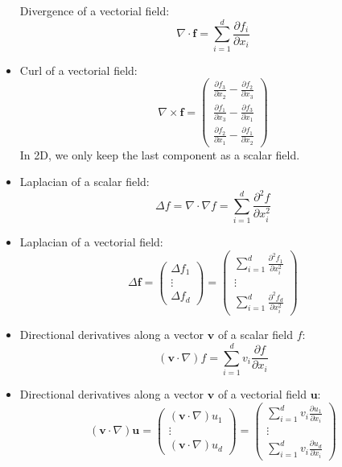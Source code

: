 \begin{itemize}
  Divergence of a vectorial field:
  \begin{equation*}
    \nabla\cdot\mathbf{f} =
    \sum_{i=1}^d \frac{\partial f_i}{\partial x_i}
  \end{equation*}
\item
  Curl of a vectorial field:
  \begin{equation*}
    \nabla\times\mathbf{f} =
    \begin{pmatrix}
      \frac{\partial f_3}{\partial x_2} - \frac{\partial f_2}{\partial x_3} \\
      \frac{\partial f_1}{\partial x_3} - \frac{\partial f_3}{\partial x_1} \\
      \frac{\partial f_2}{\partial x_1} - \frac{\partial f_1}{\partial x_2}
    \end{pmatrix}
  \end{equation*}
  In 2D, we only keep the last component as a scalar field.
\item
  Laplacian of a scalar field:
  \begin{equation*}
    \Delta f = \nabla\cdot\nabla f =
    \sum_{i=1}^d \frac{\partial^2 f}{\partial x_i^2}
  \end{equation*}
\item
  Laplacian of a vectorial field:
  \begin{equation*}
    \Delta \mathbf{f} =
    \begin{pmatrix}
      \Delta f_1 \\ \vdots \\ \Delta f_d
    \end{pmatrix} =
    \begin{pmatrix}
      \sum_{i=1}^d \frac{\partial^2 f_1}{\partial x_i^2}\\
      \vdots \\
      \sum_{i=1}^d \frac{\partial^2 f_d}{\partial x_i^2}
    \end{pmatrix}
  \end{equation*}
\item
  Directional derivatives along a vector $\mathbf{v}$ of a scalar field $f$:
  \begin{equation*}
    (\mathbf{v}\cdot\nabla)f =
    \sum_{i=1}^d v_i\frac{\partial f}{\partial x_i}
  \end{equation*}
\item
  Directional derivatives along a vector $\mathbf{v}$ of a vectorial field
  $\mathbf{u}$:
  \begin{equation*}
    (\mathbf{v}\cdot\nabla)\mathbf{u} =
    \begin{pmatrix}
      (\mathbf{v}\cdot\nabla)u_1 \\
      \vdots \\
      (\mathbf{v}\cdot\nabla)u_d
    \end{pmatrix} =
    \begin{pmatrix}
      \sum_{i=1}^d v_i\frac{\partial u_1}{\partial x_i} \\
      \vdots \\
      \sum_{i=1}^d v_i\frac{\partial u_d}{\partial x_i}
    \end{pmatrix}
  \end{equation*}
\end{itemize}

